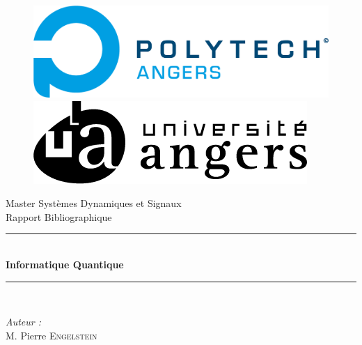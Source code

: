 \documentclass[12pt,a4paper]{report}
\begin{document}
\begin{titlepage}
    \begin{center}
      \begin{figure}[!tbp]
        \centering
        \begin{minipage}[b]{0.4\textwidth}
          \includegraphics[width=\textwidth]{Polytech_Angers.png}
        \end{minipage}
        \hfill
        \begin{minipage}[b]{0.4\textwidth}
          \includegraphics[width=\textwidth]{LogoUnivAngers.png}
        \end{minipage}
      \end{figure}
      {\large Master Systèmes Dynamiques et Signaux}\\[0.5cm]
      {\large Rapport Bibliographique}\\[0.5cm]
      \rule{\linewidth}{0.5mm} \\[0.4cm]
      { \huge \bfseries Informatique Quantique \\[0.4cm] }
      \rule{\linewidth}{0.5mm} \\[1.5cm]
      \noindent
      \begin{minipage}{0.4\textwidth}
        \begin{flushleft} \normalsize
          \emph{Auteur :}\\
          M. Pierre \textsc{Engelstein}\\
          \end{flushleft}
          \end{minipage}%
          \begin{minipage}{0.4\textwidth}
          \begin{flushright} \normalsize

\end{flushright}
\end{minipage}
\end{center}
\end{titlepage}
\end{document}
